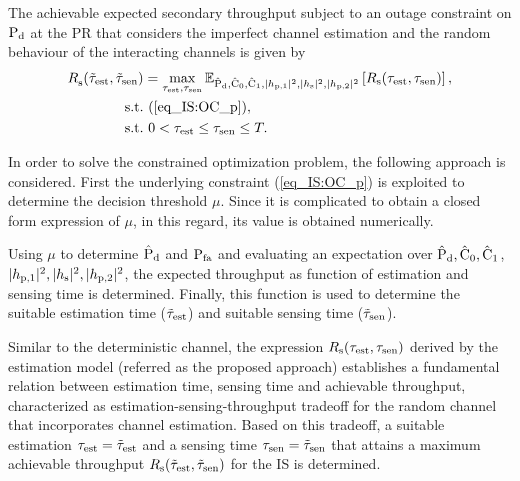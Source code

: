 \begin{theorem} \label{th_IS:th4}
\normalfont
The achievable expected secondary throughput subject to an outage constraint on $\text{P}_{\text{d}}$ at the PR that considers the imperfect channel estimation and the random behaviour of the interacting channels is given by
\begin{align}
{R}_{\text{s}}^{\text{}}(\tilde{\tau}_{\text{est}}, \tilde{\tau}_{\text{sen}}) &= \operatorname*{max}_{\tau_{\text{est}}, \tau_{\text{sen}}} {\mathbb E}_{\hat{\text{P}}_{\text{d}}, \hat{\text{C}}_{\text{0}}, \hat{\text{C}}_{\text{1}}, |h_{\text{p,1}}|^2, |h_{\text{s}}|^2, |h_{\text{p,2}}|^2}\left[ R_{\text{s}}(\tau_{\text{est}}, \tau_{\text{sen}}) \right], \nonumber \\ 
\text{s.t.} & \text{ }  (\ref{eq_IS:OC_p}),  \\
\text{s.t.} & \text{ }  0 < \tau_{\text{est}} \le \tau_{\text{sen}} \le T. \nonumber
\end{align}
\end{theorem}

\begin{IEEEproof}[Solution]
In order to solve the constrained optimization problem, the following approach is considered. First the underlying constraint (\ref{eq_IS:OC_p}) is exploited to determine the decision threshold $\mu$. Since it is complicated to obtain a closed form expression of $\mu$, in this regard, its value is obtained numerically.

Using $\mu$ to determine $\hat{\text{P}}_{\text{d}}$ and $\text{P}_{\text{fa}}$ and evaluating an expectation over $\hat{\text{P}}_{\text{d}}, \hat{\text{C}}_{\text{0}}, \hat{\text{C}}_{\text{1}}$, $|h_{\text{p,1}}|^2, |h_{\text{s}}|^2, |h_{\text{p,2}}|^2$, the expected throughput as function of estimation and sensing time is determined. Finally, this function is used to determine the suitable estimation time ($\tilde{\tau}_{\text{est}}$) and suitable sensing time ($\tilde{\tau}_{\text{sen}}$).
\end{IEEEproof}


\begin{remark} \label{rem_IS:rem4}
\normalfont
Similar to the deterministic channel, the expression $R_{\text{s}}(\tau_{\text{est}}, \tau_{\text{sen}})$ derived by the estimation model (referred as the proposed approach) establishes a fundamental relation between estimation time, sensing time and achievable throughput, characterized as estimation-sensing-throughput tradeoff for the random channel that incorporates channel estimation. Based on this tradeoff, a suitable estimation $\tau_{\text{est}} = \tilde{\tau}_{\text{est}}$ and a sensing time $\tau_{\text{sen}} = \tilde{\tau}_{\text{sen}}$ that attains a maximum achievable throughput $R_{\text{s}}(\tilde{\tau}_{\text{est}},\tilde{\tau}_{\text{sen}})$ for the IS is determined.
\end{remark}


